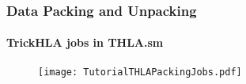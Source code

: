    \begin{frame}
      \frametitle{Data Packing and Unpacking}
      \framesubtitle{TrickHLA jobs in THLA.sm}
      \begin{figure}
      \texttt{[image: TutorialTHLAPackingJobs.pdf]}
      \end{figure}
   \end{frame}